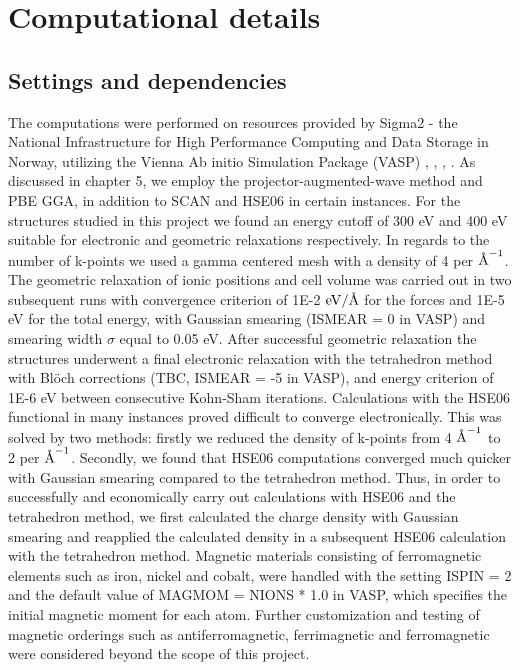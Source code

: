 \chapter{Computational details}
\label{sec:Computation}

\section{Settings and dependencies}

The computations were performed on resources provided by Sigma2 - the National Infrastructure for High Performance Computing and Data Storage in Norway, utilizing the Vienna Ab initio Simulation Package (VASP) \cite{vasp1}, \cite{vasp2}, \cite{vasp3}, \cite{vasp4}. As discussed in chapter 5, we employ the projector-augmented-wave method and PBE GGA, in addition to SCAN and HSE06 in certain instances. For the structures studied in this project we found an energy cutoff of 300 eV and 400 eV suitable for electronic and geometric relaxations respectively. In regards to the number of k-points we used a gamma centered mesh with a density of 4 per $\AA^{-1}$. The geometric relaxation of ionic positions and cell volume was carried out in two subsequent runs with convergence criterion of \num{1E-2} $\si{\eV}/\AA$ for the forces and \num{1E-5} eV for the total energy, with Gaussian smearing (ISMEAR = 0 in VASP) and smearing width $\sigma$ equal to 0.05 eV. After successful geometric relaxation the structures underwent a final electronic relaxation with the tetrahedron method with Bl\"{o}ch corrections (TBC, ISMEAR = -5 in VASP), and energy criterion of \num{1E-6} eV between consecutive Kohn-Sham iterations. Calculations with the HSE06 functional in many instances proved difficult to converge electronically. This was solved by two methods: firstly we reduced the density of k-points from 4 $\AA^{-1}$ to 2 per $\AA^{-1}$. Secondly, we found that HSE06 computations converged much quicker with Gaussian smearing compared to the tetrahedron method. Thus, in order to successfully and economically carry out calculations with HSE06 and the tetrahedron method, we first calculated the charge density with Gaussian smearing and reapplied the calculated density in a subsequent HSE06 calculation with the tetrahedron method. Magnetic materials consisting of ferromagnetic elements such as iron, nickel and cobalt, were handled with the setting ISPIN = 2 and the default value of MAGMOM = NIONS * 1.0 in VASP, which specifies the initial magnetic moment for each atom.  Further customization and testing of magnetic orderings such as antiferromagnetic, ferrimagnetic and ferromagnetic were considered beyond the scope of this project.  

